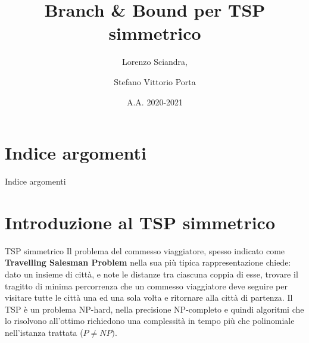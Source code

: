 \documentclass[10pt]{beamer}
\title{Branch \& Bound per TSP simmetrico}
\author{Lorenzo Sciandra, \and Stefano Vittorio Porta}
\date{A.A. 2020-2021}
\institute{Università degli Studi di Torino}
\begin{document}
\maketitle

\section{Indice argomenti}

\begin{frame}{Indice argomenti}
    \tableofcontents
\end{frame}

\section{Introduzione al TSP simmetrico}
\begin{frame}{TSP simmetrico}
    Il problema del commesso viaggiatore, spesso indicato come \textbf{Travelling Salesman Problem} nella sua più tipica rappresentazione chiede: dato un insieme di città, e note le distanze tra ciascuna coppia di esse, trovare il tragitto di minima percorrenza che un commesso viaggiatore deve seguire per visitare tutte le città una ed una sola volta e ritornare alla città di partenza.
    \newline
    \newline
    Il TSP è un problema NP-hard, nella precisione NP-completo e quindi algoritmi che lo risolvono all'ottimo richiedono una complessità in tempo più che polinomiale nell'istanza trattata ($P \neq NP)$.
\end{frame}
\end{document}

